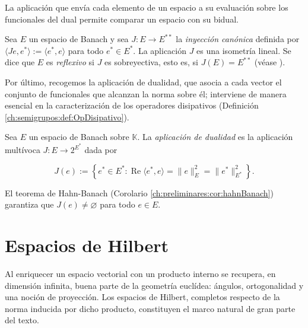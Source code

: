 La aplicación que envía cada elemento de un espacio a su evaluación sobre los
funcionales del dual permite comparar un espacio con su bidual.\\

\begin{Definicion}
\label{ch:preliminares:def:reflexivo}

Sea $E$ un espacio de Banach y sea $J : E \rightarrow E^{**}$ la
\textit{inyección canónica} definida por
$\langle J e, e^* \rangle := \langle e^*, e \rangle$ para todo $e^* \in E^*$. La
aplicación $J$ es una isometría lineal. Se dice que $E$ es \textit{reflexivo} si
$J$ es sobreyectiva, esto es, si $J(E) = E^{**}$
(véase \cite[Cap.~3]{brezis-2011-fun-ana-sob}).
\end{Definicion}

Por último, recogemos la aplicación de dualidad, que asocia a cada vector el
conjunto de funcionales que alcanzan la norma sobre él; interviene de manera
esencial en la caracterización de los operadores disipativos
(Definición \ref{ch:semigrupos:def:OpDisipativo}).\\

\begin{Definicion}
\label{ch:preliminares:def:dualidad}

Sea $E$ un espacio de Banach sobre $\mathbb{K}$. La \textit{aplicación de
dualidad} es la aplicación multívoca $J : E \rightarrow 2^{E^*}$ dada por

\[J(e) := \left\{ e^* \in E^* : \operatorname{Re}\langle e^*, e \rangle = \lVert e \rVert_E^2 = \lVert e^* \rVert_{E^*}^2 \right\}.\]

El teorema de Hahn-Banach (Corolario \ref{ch:preliminares:cor:hahnBanach}) garantiza
que $J(e) \neq \varnothing$ para todo $e \in E$.
\end{Definicion}

\section{Espacios de Hilbert}
\label{ch:preliminares:section:Hilbert}

Al enriquecer un espacio vectorial con un producto interno se recupera, en
dimensión infinita, buena parte de la geometría euclídea: ángulos, ortogonalidad
y una noción de proyección. Los espacios de Hilbert, completos respecto de la
norma inducida por dicho producto, constituyen el marco natural de gran parte del
texto.\\

